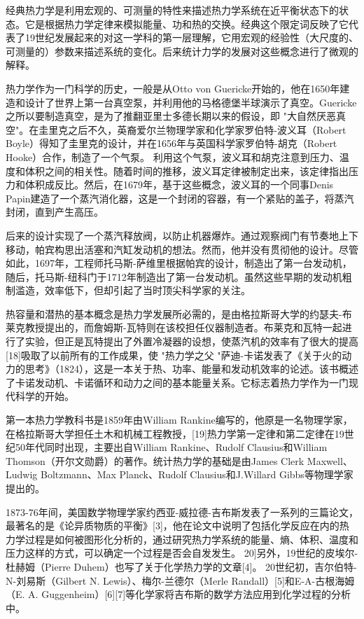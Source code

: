 经典热力学是利用宏观的、可测量的特性来描述热力学系统在近平衡状态下的状态。它是根据热力学定律来模拟能量、功和热的交换。经典这个限定词反映了它代表了19世纪发展起来的对这一学科的第一层理解，它用宏观的经验性（大尺度的、可测量的）参数来描述系统的变化。后来统计力学的发展对这些概念进行了微观的解释。

热力学作为一门科学的历史，一般是从Otto von Guericke开始的，他在1650年建造和设计了世界上第一台真空泵，并利用他的马格德堡半球演示了真空。Guericke之所以要制造真空，是为了推翻亚里士多德长期以来的假设，即 "大自然厌恶真空"。在圭里克之后不久，英裔爱尔兰物理学家和化学家罗伯特-波义耳（Robert Boyle）得知了圭里克的设计，并在1656年与英国科学家罗伯特-胡克（Robert Hooke）合作，制造了一个气泵。 利用这个气泵，波义耳和胡克注意到压力、温度和体积之间的相关性。随着时间的推移，波义耳定律被制定出来，该定律指出压力和体积成反比。然后，在1679年，基于这些概念，波义耳的一个同事Denis Papin建造了一个蒸汽消化器，这是一个封闭的容器，有一个紧贴的盖子，将蒸汽封闭，直到产生高压。

后来的设计实现了一个蒸汽释放阀，以防止机器爆炸。通过观察阀门有节奏地上下移动，帕宾构思出活塞和汽缸发动机的想法。然而，他并没有贯彻他的设计。尽管如此，1697年，工程师托马斯-萨维里根据帕宾的设计，制造出了第一台发动机，随后，托马斯-纽科门于1712年制造出了第一台发动机。虽然这些早期的发动机粗制滥造，效率低下，但却引起了当时顶尖科学家的关注。

热容量和潜热的基本概念是热力学发展所必需的，是由格拉斯哥大学的约瑟夫-布莱克教授提出的，而詹姆斯-瓦特则在该校担任仪器制造者。布莱克和瓦特一起进行了实验，但正是瓦特提出了外置冷凝器的设想，使蒸汽机的效率有了很大的提高[18]吸取了以前所有的工作成果，使 "热力学之父 "萨迪-卡诺发表了《关于火的动力的思考》（1824），这是一本关于热、功率、能量和发动机效率的论述。该书概述了卡诺发动机、卡诺循环和动力之间的基本能量关系。它标志着热力学作为一门现代科学的开始。

第一本热力学教科书是1859年由William Rankine编写的，他原是一名物理学家，在格拉斯哥大学担任土木和机械工程教授，[19]热力学第一定律和第二定律在19世纪50年代同时出现，主要出自William Rankine、Rudolf Clausius和William Thomson（开尔文勋爵）的著作。统计热力学的基础是由James Clerk Maxwell、Ludwig Boltzmann、Max Planck、Rudolf Clausius和J.Willard Gibbs等物理学家提出的。

1873-76年间，美国数学物理学家约西亚-威拉德-吉布斯发表了一系列的三篇论文，最著名的是《论异质物质的平衡》[3]，他在论文中说明了包括化学反应在内的热力学过程是如何被图形化分析的，通过研究热力学系统的能量、熵、体积、温度和压力这样的方式，可以确定一个过程是否会自发发生。 20]另外，19世纪的皮埃尔-杜赫姆（Pierre Duhem）也写了关于化学热力学的文章[4]。 20世纪初，吉尔伯特-N-刘易斯（Gilbert N. Lewis）、梅尔-兰德尔（Merle Randall）[5]和E-A-古根海姆（E. A. Guggenheim）[6][7]等化学家将吉布斯的数学方法应用到化学过程的分析中。

